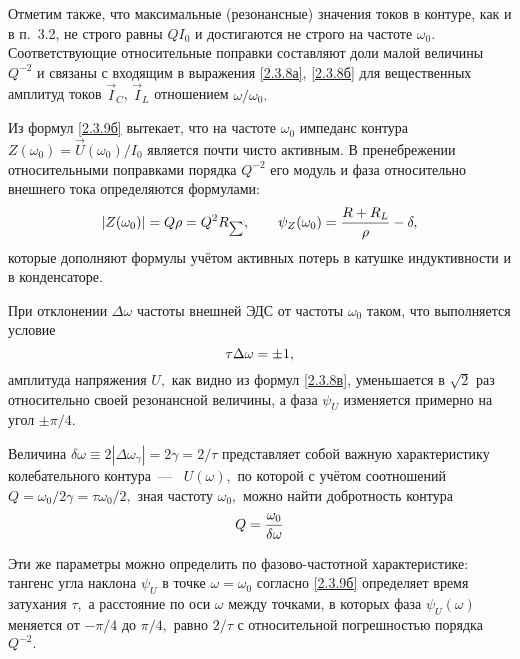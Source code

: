 Отметим также, что максимальные (резонансные) значения токов в контуре, как и в п.~3.2, не строго равны $QI_0$ и достигаются не строго на частоте $\omega_0.$ Соответствующие относительные поправки составляют доли малой величины $Q^{-2}$ и связаны с входящим в выражения \eqref{2.3.8а}, \eqref{2.3.8б} для вещественных амплитуд токов $\vec I_C$, $\vec I_L$ отношением $\omega/\omega_0.$

Из формул \eqref{2.3.9б} вытекает, что на частоте $\omega_0$ импеданс контура $Z(\omega_0)=\vec U(\omega_0)/I_0$ является почти чисто активным. В пренебрежении относительными поправками порядка $Q^{-2}$ его модуль и фаза относительно внешнего тока определяются формулами:
\begin{equation}\eqmark{2.3.10}
|Z(\omega_0)|=Q\rho=Q^2R_{\scriptscriptstyle \sum}, \qquad \psi_Z(\omega_0)=\dfrac{R+R_L}{\rho}-\delta,
\end{equation}
которые дополняют формулы  учётом активных потерь в катушке индуктивности и в конденсаторе.

При отклонении $\Delta\omega$ частоты внешней ЭДС от частоты $\omega_0$ таком, что выполняется условие
\begin{equation}\eqmark{2.3.11}
\tau\Delta\omega=\pm1,
\end{equation}
амплитуда напряжения $U,$ как видно из формул \eqref{2.3.8в}, уменьшается в $\sqrt{2}$ раз относительно своей резонансной величины, а фаза $\psi_U$ изменяется примерно на угол $\pm\pi/4.$

Величина $\delta\omega\equiv2|\Delta\omega_{\gamma}|=2\gamma=2/\tau$ представляет собой важную характеристику колебательного контура~---~ $U(\omega),$ по которой с учётом соотношений $Q=\omega_0/2\gamma=\tau\omega_0/2,$ зная частоту $\omega_0,$ можно найти добротность контура
\begin{equation}\eqmark{2.3.12}
Q=\dfrac{\omega_0}{\delta\omega}
\end{equation}

Эти же параметры можно определить по фазово-частотной характеристике: тангенс угла наклона $\psi_U$ в точке $\omega=\omega_0$ согласно \eqref{2.3.9б} определяет время затухания $\tau,$ а расстояние по оси $\omega$ между точками, в которых фаза $\psi_U(\omega)$ меняется от $-\pi/4$ до $\pi/4,$ равно $2/\tau$ с относительной погрешностью порядка $Q^{-2}.$

